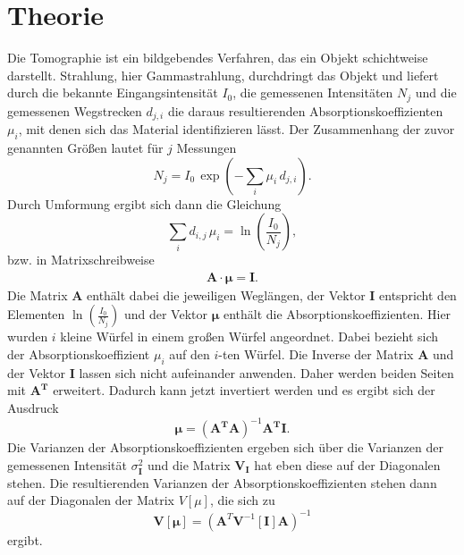 \section{Theorie}

Die Tomographie ist ein bildgebendes Verfahren, das ein Objekt schichtweise darstellt. Strahlung, hier Gammastrahlung, durchdringt das Objekt und liefert durch die bekannte Eingangsintensität $I_0$, die gemessenen Intensitäten $N_j$ und die gemessenen Wegstrecken $d_{j,i}$ die daraus resultierenden Absorptionskoeffizienten $\mu_i$, mit denen sich das Material identifizieren lässt. 
Der Zusammenhang der zuvor genannten Größen lautet für $j$ Messungen
\begin{equation*}
    N_j = I_0 \, \exp\left(- \sum_{i} \mu_i \, d_{j,i} \right).
\end{equation*}
Durch Umformung ergibt sich dann die Gleichung 
\begin{equation}\label{eq:linearKoeff}
    \sum_i d_{i,j} \, \mu_i = \ln \left( \frac{I_0}{N_j} \right),
\end{equation}
bzw. in Matrixschreibweise 
\begin{align}\label{eq:LGS_mu}
\mathbf{A} \cdot \symbf{\mu} = \mathbf{I}.
\end{align}
Die Matrix $\mathbf{A}$ enthält dabei die jeweiligen Weglängen, der Vektor $\mathbf{I}$ entspricht den Elementen $\ln\! \left( \frac{I_0}{N_j} \right)$ und der Vektor $\symbf{\mu}$ enthält die Absorptionskoeffizienten.
Hier wurden $i$ kleine Würfel in einem großen Würfel angeordnet. Dabei bezieht sich der Absorptionskoeffizient $\mu_i$ auf den $i$-ten Würfel.
Die Inverse der Matrix $\mathbf{A}$ und der Vektor $\mathbf{I}$ lassen sich nicht aufeinander anwenden. Daher werden beiden Seiten mit $\mathbf{A^T}$ erweitert. Dadurch kann jetzt invertiert werden und es ergibt sich der Ausdruck 
\begin{equation*}
    \symbf{\mu} = \left( \mathbf{A^T} \mathbf{A} \right)^{-1} \mathbf{A^T} \mathbf{I}.
\end{equation*}
Die Varianzen der Absorptionskoeffizienten ergeben sich über die Varianzen der gemessenen Intensität $\sigma_{\mathbf{I}}^2$ und die Matrix $\mathbf{V_{I}}$ hat eben diese auf der Diagonalen stehen.
Die resultierenden Varianzen der Absorptionskoeffizienten stehen dann auf der Diagonalen der Matrix $V[\mu]$, die sich zu 
\begin{equation}\label{eq:kov}
    \mathbf{V}[\symbf{\mu}] = \left(\mathbf{A}^T\mathbf{V}^{-1}[\mathbf{I}]\mathbf{A}\right)^{-1}
\end{equation}
ergibt.

